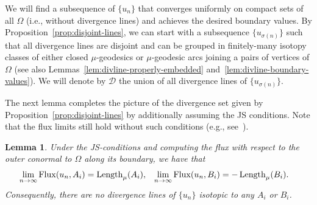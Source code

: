 \documentclass[a4paper,10pt,reqno]{amsart}
\newcommand{\Length}{\mathop{\rm Length}\nolimits}
\newcommand{\Flux}{\mathrm{Flux}}
\newtheorem{lemma}[theorem]{Lemma}
\theoremstyle{definition}
\theoremstyle{remark}
\numberwithin{equation}{section}
\begin{document}
We will find a subsequence of $\{u_n\}$ that converges uniformly on compact sets of all $\Omega$ (i.e., without divergence lines) and achieves the desired boundary values. By Proposition~\ref{prop:disjoint-lines}, we can start with a subsequence $\{u_{\sigma(n)}\}$ such that all divergence lines are disjoint and can be grouped in finitely-many isotopy classes of either closed $\mu$-geodesics or $\mu$-geodesic arcs joining a pairs of vertices of $\Omega$ (see also Lemmas~\ref{lem:divline-properly-embedded} and~\ref{lem:divline-boundary-values}). We will denote by $\mathcal D$ the union of all divergence lines of $\{u_{\sigma(n)}\}$.

The next lemma completes the picture of the divergence set given by Proposition~\ref{prop:disjoint-lines} by additionally assuming the JS conditions. Note that the flux limits still hold without such conditions (e.g., see~\cite[Lemma~3.6]{MRR}).

\begin{lemma}\label{lemma:isotopy-boundary}
Under the JS-conditions and computing the flux with respect to the outer conormal to $\Omega$ along its boundary, we have that
\begin{align*}
  \lim_{n\to\infty}\Flux(u_n,A_i)&=\Length_\mu(A_i),& \lim_{n\to\infty}\Flux(u_n,B_i)&=-\Length_\mu(B_i).
\end{align*}
Consequently, there are no divergence lines of $\{u_n\}$ isotopic to any $A_i$ or $B_i$.
\end{lemma}
\end{document}
